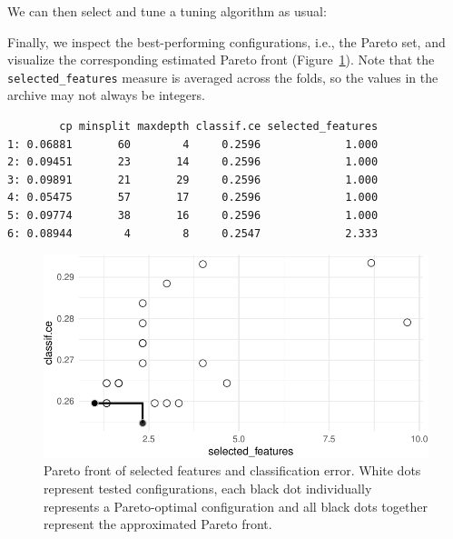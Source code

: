 We can then select and tune a tuning algorithm as usual:

\begin{Shaded}
\begin{Highlighting}[]
\OtherTok{=} \NormalTok{(}\NormalTok{)}
\SpecialCharTok{$}
\end{Highlighting}
\end{Shaded}

Finally, we inspect the best-performing configurations, i.e., the Pareto
set, and visualize the corresponding estimated Pareto front
(Figure~\ref{fig-pareto}). Note that the \texttt{selected\_features}
measure is averaged across the folds, so the values in the archive may
not always be integers.

\begin{Shaded}
\begin{Highlighting}[]
\SpecialCharTok{$}\SpecialCharTok{$}\NormalTok{()[, .(cp, minsplit, maxdepth, classif.ce,}
\NormalTok{  selected\_features)]}
\end{Highlighting}
\end{Shaded}

\begin{verbatim}
        cp minsplit maxdepth classif.ce selected_features
1: 0.06881       60        4     0.2596             1.000
2: 0.09451       23       14     0.2596             1.000
3: 0.09891       21       29     0.2596             1.000
4: 0.05475       57       17     0.2596             1.000
5: 0.09774       38       16     0.2596             1.000
6: 0.08944        4        8     0.2547             2.333
\end{verbatim}

\begin{figure}

{\centering \includegraphics[width=1\textwidth,height=\textheight]{chapters/chapter5/advanced_tuning_methods_and_black_box_optimization_files/figure-pdf/fig-pareto-1.pdf}

}

\caption{\label{fig-pareto}Pareto front of selected features and
classification error. White dots represent tested configurations, each
black dot individually represents a Pareto-optimal configuration and all
black dots together represent the approximated Pareto front.}

\end{figure}

